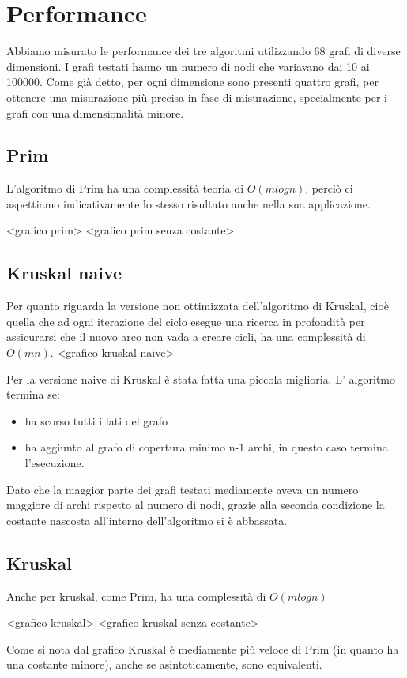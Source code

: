 \section{Performance}
Abbiamo misurato le performance dei tre algoritmi utilizzando 68 grafi di diverse dimensioni.
I grafi testati hanno un numero di nodi che variavano dai  10 ai 100000.
Come già detto, per ogni dimensione sono presenti quattro grafi, per ottenere una misurazione più precisa in fase di misurazione, specialmente per i grafi con una dimensionalità minore.
\subsection{Prim}
L'algoritmo di Prim ha una complessità teoria di $O(mlogn)$, perciò ci aspettiamo indicativamente lo stesso risultato anche nella sua applicazione.

<grafico prim>
<grafico prim senza costante>
\subsection{Kruskal naive}
Per quanto riguarda la versione non ottimizzata dell'algoritmo di Kruskal, cioè quella che ad ogni iterazione del ciclo esegue una ricerca in profondità per assicurarsi che il nuovo arco non vada a creare cicli, ha una complessità di $O(mn)$.
<grafico kruskal naive>

Per la versione naive di Kruskal è stata fatta una piccola miglioria. L' algoritmo termina se:
\begin{itemize}
    \item ha scorso tutti i lati del grafo
    \item ha aggiunto al grafo di copertura minimo n-1 archi, in questo caso termina l'esecuzione.
\end{itemize}
Dato che la maggior parte dei grafi testati mediamente aveva un numero maggiore di archi rispetto al numero di nodi, grazie alla seconda condizione la costante nascosta all'interno dell'algoritmo si è abbassata. 

\subsection{Kruskal}
Anche per kruskal, come Prim, ha una complessità di $O(mlogn)$

<grafico kruskal>
<grafico kruskal senza costante>

Come si nota dal grafico Kruskal è mediamente più veloce di Prim (in quanto ha una costante minore), anche se asintoticamente, sono equivalenti.

